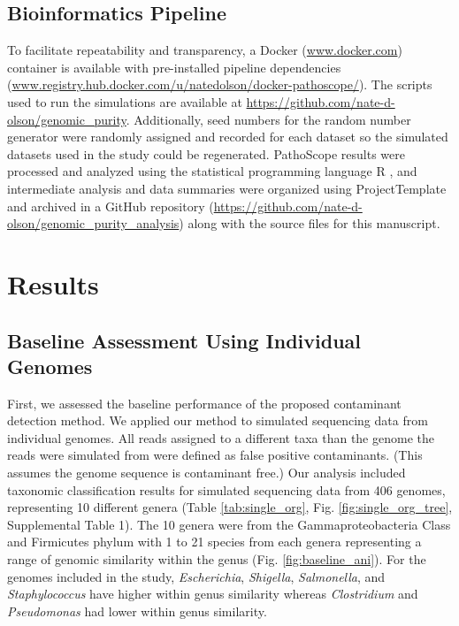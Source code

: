 \documentclass[fleqn,10pt,lineno]{wlpeerj}\usepackage[]{graphicx}\usepackage[]{color}
\begin{document}
\subsection*{Bioinformatics Pipeline}

To facilitate repeatability and transparency, a Docker (\url{www.docker.com}) container is available
with pre-installed pipeline dependencies (\url{www.registry.hub.docker.com/u/natedolson/docker-pathoscope/}).
The scripts used to run the simulations are available at \url{https://github.com/nate-d-olson/genomic_purity}.
Additionally, seed numbers for the random number generator were randomly assigned and recorded for each dataset so the simulated datasets used in the study could be regenerated.
PathoScope results were processed and analyzed using the statistical programming language R \citep{R}, and intermediate analysis and data summaries were organized using ProjectTemplate \citep{ProjectTemplate} and archived in a GitHub repository (\url{https://github.com/nate-d-olson/genomic_purity_analysis}) along with the source files for this manuscript. 


\section*{Results}

\subsection*{Baseline Assessment Using Individual Genomes}

First, we assessed the baseline performance of the proposed contaminant detection method. 
We applied our method to simulated sequencing data from individual genomes. 
All reads assigned to a different taxa than the genome the reads were simulated from were defined as false positive contaminants. 
(This assumes the genome sequence is contaminant free.) 
Our analysis included taxonomic classification results for simulated sequencing data  from 406 genomes, representing 10 different genera (Table \ref{tab:single_org}, Fig. \ref{fig:single_org_tree}, Supplemental Table 1). 
The 10 genera were from the Gammaproteobacteria Class and Firmicutes phylum with 1 to 21 species from each genera representing a range of genomic similarity within the genus (Fig. \ref{fig:baseline_ani}). 
For the genomes included in the study, \textit{Escherichia}, \textit{Shigella}, \textit{Salmonella}, and \textit{Staphylococcus} have higher within genus similarity whereas \textit{Clostridium} and \textit{Pseudomonas} had lower within genus similarity. 
\end{document}
